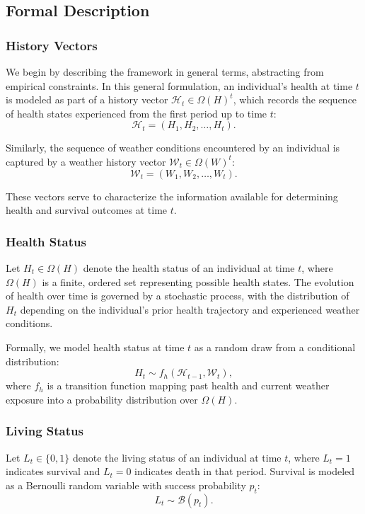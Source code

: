 \documentclass{article}
\begin{document}
\subsection{Formal Description}\label{formal_description}

\subsubsection{History Vectors}

We begin by describing the framework in general terms, abstracting from empirical constraints. In this general formulation, an individual’s health at time $t$ is modeled as part of a history vector $\mathcal{H}_t \in \Omega(H)^t$, which records the sequence of health states experienced from the first period up to time $t$:
\[
\mathcal{H}_t = (H_1, H_2, \dots, H_t).
\]

Similarly, the sequence of weather conditions encountered by an individual is captured by a weather history vector $\mathcal{W}_t \in \Omega(W)^t$:
\[
\mathcal{W}_t = (W_1, W_2, \dots, W_t).
\]

These vectors serve to characterize the information available for determining health and survival outcomes at time $t$.

\subsubsection{Health Status}

Let $H_t \in \Omega(H)$ denote the health status of an individual at time $t$, where $\Omega(H)$ is a finite, ordered set representing possible health states. The evolution of health over time is governed by a stochastic process, with the distribution of $H_t$ depending on the individual's prior health trajectory and experienced weather conditions.

Formally, we model health status at time $t$ as a random draw from a conditional distribution:
\[
H_t \sim f_h(\mathcal{H}_{t-1}, \mathcal{W}_t),
\]
where $f_h$ is a transition function mapping past health and current weather exposure into a probability distribution over $\Omega(H)$.

\subsubsection{Living Status}

Let $L_t \in \{0,1\}$ denote the living status of an individual at time $t$, where $L_t = 1$ indicates survival and $L_t = 0$ indicates death in that period. Survival is modeled as a Bernoulli random variable with success probability $p_t$:
\[
L_t \sim \mathcal{B}(p_t).
\]
\end{document}
